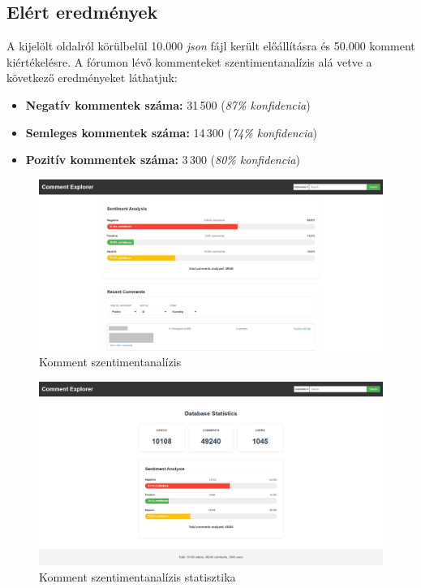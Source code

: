 \documentclass[12pt]{article}
\begin{document}
\subsection{Elért eredmények}

A kijelölt oldalról körülbelül 10.000 \textit{json} fájl került előállításra és 50.000 komment kiértékelésre. A fórumon lévő kommenteket szentimentanalízis alá vetve a következő eredményeket láthatjuk:

\begin{itemize}
    \item \textbf{Negatív kommentek száma:} 31\,500 (\textit{87\% konfidencia})
    \item \textbf{Semleges kommentek száma:} 14\,300 (\textit{74\% konfidencia})
    \item \textbf{Pozitív kommentek száma:} 3\,300 (\textit{80\% konfidencia})
\end{itemize}

\begin{figure}[H]
  \centering
  \includegraphics[width=\linewidth]{images/06_comment_home.png}
  \caption{Komment szentimentanalízis}
  \label{fig:06_comment_home}
\end{figure}

\begin{figure}[H]
  \centering
  \includegraphics[width=\linewidth]{images/07_comment_stats.png}
  \caption{Komment szentimentanalízis statisztika}
  \label{fig:07_comment_stats}
\end{figure}
\end{document}
